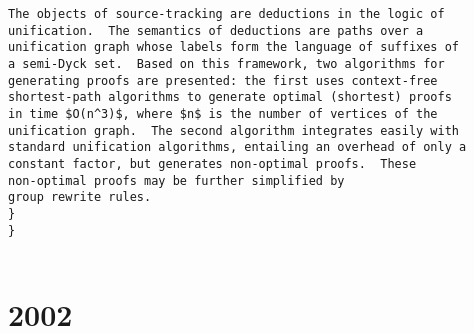 \documentclass[11pt]{article}
\begin{document}
\begin{lstlisting}
The objects of source-tracking are deductions in the logic of
unification.  The semantics of deductions are paths over a
unification graph whose labels form the language of suffixes of
a semi-Dyck set.  Based on this framework, two algorithms for
generating proofs are presented: the first uses context-free
shortest-path algorithms to generate optimal (shortest) proofs
in time $O(n^3)$, where $n$ is the number of vertices of the
unification graph.  The second algorithm integrates easily with
standard unification algorithms, entailing an overhead of only a
constant factor, but generates non-optimal proofs.  These
non-optimal proofs may be further simplified by
group rewrite rules.
}
}


\end{lstlisting}
\section{2002}
\label{sec:orgb63ffbf}
\lstset{language=bibtex,label= ,caption= ,captionpos=b,numbers=none}
\end{document}
